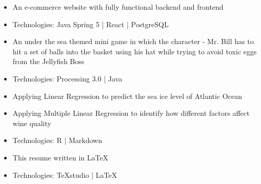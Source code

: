 \documentclass[10pt,a4paper,ragged2e]{altacv}
\begin{document}



\makecvheader



\begin{paracol}{2}


\begin{itemize}
	\item An e-commerce website with fully functional backend and frontend
	\item Technologies: Java Spring 5 | React | PostgreSQL
\end{itemize}

\divider

\begin{itemize}
\item An under the sea themed mini game in which the character - Mr. Bill has to hit a set of balls into the basket using his hat while trying to avoid toxic eggs from the Jellyfish Boss
\item Technologies: Processing 3.0 | Java
\end{itemize}

\divider

\begin{itemize}
\item Applying Linear Regression to predict the sea ice level of Atlantic Ocean
\item Applying Multiple Linear Regression to identify how different factors affect wine quality
\item Technologies: R | Markdown
\end{itemize}

\divider

\begin{itemize}
	\item This resume written in LaTeX
	\item Technologies: TeXstudio | LaTeX
\end{itemize}


\end{paracol}
\end{document}
